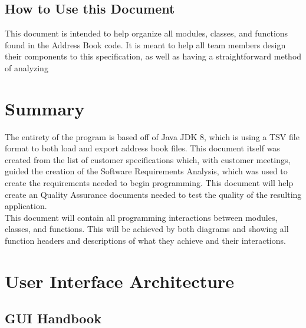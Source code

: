 \documentclass[a4paper, 11pt]{article}
\begin{document}
\subsection{How to Use this Document}
This document is intended to help organize all modules, classes, and functions found in the Address Book code. It is meant to help all team members design their components to this specification, as well as having a straightforward method of analyzing 
\section{Summary}
The entirety of the program is based off of Java JDK 8, which is using a TSV file format to both load and export address book files. This document itself was created from the list of customer specifications which, with customer meetings, guided the creation of the Software Requirements Analysis, which was used to create the requirements needed to begin programming. This document will help create an Quality Assurance documents needed to test the quality of the resulting application. \\
This document will contain all programming interactions between modules, classes, and functions. This will be achieved by both diagrams and showing all function headers and descriptions of what they achieve and their interactions.
\section{User Interface Architecture}
\subsection{GUI Handbook}
\end{document}
